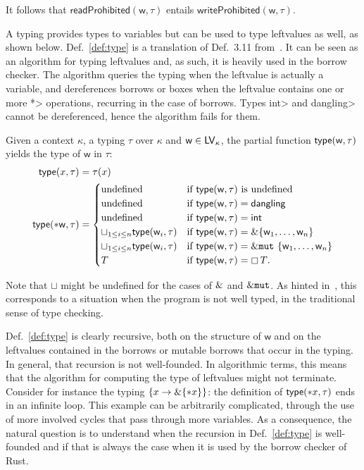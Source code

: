 \noindent
It follows that $\mathsf{readProhibited}(\mathsf{w},\tau)$ entails
$\mathsf{writeProhibited}(\mathsf{w},\tau)$.

A typing provides types to variables but can be used to type
leftvalues as well, as shown below. Def.~\ref{def:type} is a translation of
Def.~3.11 from~\cite{Pearce21}. It can be seen as an algorithm for typing leftvalues
and, as such, it is heavily used in the borrow checker.
The algorithm queries the typing when the leftvalue is actually a variable,
and dereferences borrows or boxes when the leftvalue contains one or more
\<*> operations, recurring in the case of borrows.
Types \<int> and \<dangling> cannot be dereferenced, hence the
algorithm fails for them.

\begin{definition}\label{def:type}
  Given a context $\kappa$, a typing $\tau$ over $\kappa$
  and $\mathsf{w}\in\mathsf{LV}_\kappa$, the partial function
  $\mathsf{type}(\mathsf{w},\tau)$ yields the type of $\mathsf{w}$ in $\tau$:
  \begin{align*}
    \mathsf{type}(x,\tau)&=\tau(x)\\
    \mathsf{type}(*\mathsf{w},\tau)&=\begin{cases}
    \text{undefined} & \text{if $\mathsf{type}(\mathsf{w},\tau)$ is undefined}\\
    \text{undefined} & \text{if $\mathsf{type}(\mathsf{w},\tau)=\mathsf{dangling}$}\\
    \text{undefined} & \text{if $\mathsf{type}(\mathsf{w},\tau)=\mathsf{int}$}\\
    \sqcup_{1\le i\le n}\mathsf{type}(\mathsf{w}_i,\tau) & \text{if $\mathsf{type}(\mathsf{w},\tau)=\&\{\mathsf{w}_1,\ldots,\mathsf{w}_n\}$}\\
    \sqcup_{1\le i\le n}\mathsf{type}(\mathsf{w}_i,\tau) & \text{if $\mathsf{type}(\mathsf{w},\tau)=\&\mathtt{mut}\ \{\mathsf{w}_1,\ldots,\mathsf{w}_n\}$}\\
    T & \text{if $\mathsf{type}(\mathsf{w},\tau)=\boxempty\,{T}$.}
    \end{cases}
  \end{align*}
\end{definition}

\noindent
Note that $\sqcup$ might be undefined for the cases of $\&$
and $\&\mathtt{mut}$.
As hinted in~\cite{Pearce21}, this corresponds to a situation when the program
is not well typed, in the traditional sense of type checking.

Def.~\ref{def:type} is clearly recursive, both on the structure of $\mathsf{w}$ and
on the leftvalues contained in the borrows or mutable borrows that occur in the typing.
In general, that recursion is not well-founded. In algorithmic terms, this means
that the algorithm for computing the type of leftvalues might not terminate.
Consider for instance the typing $\{x\to\&\{\mathtt{*}x\}\}$:
the definition of $\mathsf{type}(\mathtt{*}x,\tau)$ ends in an infinite loop.
This example can be arbitrarily complicated, through the
use of more involved cycles that pass through more variables. As a consequence,
the natural question is to understand when the recursion in
Def.~\ref{def:type} is well-founded and if that is always the case when it is
used by the borrow checker of Rust.
